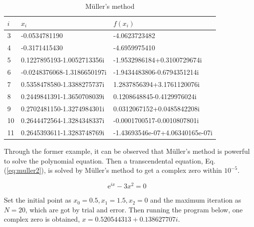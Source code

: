 \documentclass[preprint,12pt]{elsarticle}
\begin{document}
\begin{table}[p]
\begin{subtable}[h]{1\textwidth}
        \centering
        \begin{tabular}{l l l}
        \hline
        \textbf{$i$} & \textbf{$x_i$} & \textbf{$f(x_i)$}\\
        \hline
        3 & -0.0534781190 & -4.0623723482 \\
        4 & -0.3171415430 & -4.6959975410 \\
        5 & 0.1227895193-1.0052713356i & -1.9532986184+0.3100729674i \\
        6 & -0.0248376068-1.3186650197i &  -1.9434483806-0.6794351214i \\
        7 & 0.5358478580-1.3388275737i & 1.2837856394+3.1761120076i \\
        8 & 0.2449841391-1.3650708039i & 0.1208648845-0.4129976024i \\
        9 & 0.2702481150-1.3274984301i & 0.0312067152+0.0485842208i \\
        10 & 0.2644472564-1.3284348337i & -0.0001700517-0.0010807801i \\
        11 & 0.2645393611-1.3283748769i & -1.43693546e-07+4.06340165e-07i \\
        \hline
        \end{tabular}
        \caption{$x_0=1,\quad x_1=4,\quad x_2=0$}
     \end{subtable}
     \caption{M\"uller's method}
     \label{tab:muller}
\end{table}

Through the former example, it can be observed that M\"uller's method is powerful to solve the polynomial equation. Then a transcendental equation, Eq. (\ref{eq:muller2}), is solved by M\"uller's method to get a complex zero within $10^{-5}$.

\begin{equation}
    \mathrm{e}^{ix}-3x^2=0
\label{eq:muller2}
\end{equation}

Set the initial point as $x_0=0.5, x_1=1.5, x_2=0$ and the maximum iteration as $N=20$, which are got by trial and error. Then running the program below, one complex zero is obtained, $x=0.520544313+0.138627707i$.
\end{document}
